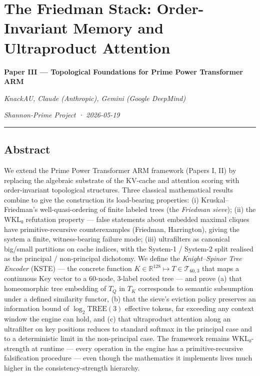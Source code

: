 \documentclass[
  11pt,
]{article}
\author{KnackAU, Claude (Anthropic), Gemini (Google DeepMind)}
\date{Shannon-Prime Project · 2026-05-19}
\begin{document}
\hypertarget{the-friedman-stack-order-invariant-memory-and-ultraproduct-attention}{%
\section{The Friedman Stack: Order-Invariant Memory and Ultraproduct
Attention}\label{the-friedman-stack-order-invariant-memory-and-ultraproduct-attention}}

\textbf{Paper III --- Topological Foundations for Prime Power
Transformer ARM}

\emph{KnackAU, Claude (Anthropic), Gemini (Google DeepMind)}

\emph{Shannon-Prime Project · 2026-05-19}

\begin{center}\rule{0.5\linewidth}{0.5pt}\end{center}

\hypertarget{abstract}{%
\subsection{Abstract}\label{abstract}}

We extend the Prime Power Transformer ARM framework (Papers I, II) by
replacing the algebraic substrate of the KV-cache and attention scoring
with order-invariant topological structures. Three classical
mathematical results combine to give the construction its load-bearing
properties: (i) Kruskal--Friedman's well-quasi-ordering of finite
labeled trees (the \emph{Friedman sieve}); (ii) the WKL₀ refutation
property --- false statements about embedded maximal cliques have
primitive-recursive counterexamples (Friedman, Harrington), giving the
system a finite, witness-bearing failure mode; (iii) ultrafilters as
canonical big/small partitions on cache indices, with the System-1 /
System-2 split realised as the principal / non-principal dichotomy. We
define the \emph{Knight--Spinor Tree Encoder} (KSTE) --- the concrete
function \(K \in \mathbb{R}^{128} \mapsto T \in \mathcal{T}_{60,3}\)
that maps a continuous Key vector to a 60-node, 3-label rooted tree ---
and prove (a) that homeomorphic tree embedding of \(T_Q\) in \(T_K\)
corresponds to semantic subsumption under a defined similarity functor,
(b) that the sieve's eviction policy preserves an information bound of
\(\log_2 \mathrm{TREE}(3)\) effective tokens, far exceeding any context
window the engine can hold, and (c) that ultraproduct attention along an
ultrafilter on key positions reduces to standard softmax in the
principal case and to a deterministic limit in the non-principal case.
The framework remains WKL₀-strength at runtime --- every operation in
the engine has a primitive-recursive falsification procedure --- even
though the mathematics it implements lives much higher in the
consistency-strength hierarchy.
\end{document}
